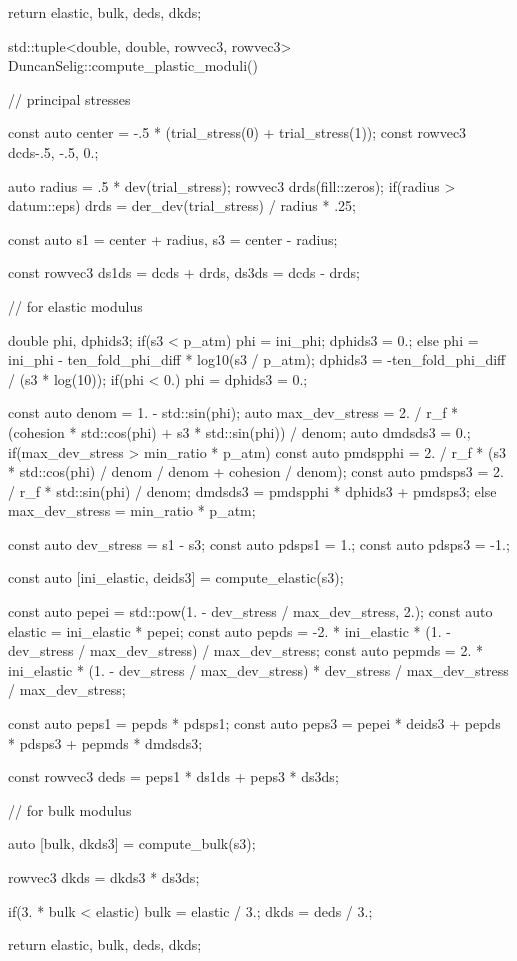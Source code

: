 \begin{cppcode}
{    return {elastic, bulk, deds, dkds};
}

std::tuple<double, double, rowvec3, rowvec3> DuncanSelig::compute_plastic_moduli() {
    // principal stresses

    const auto center = -.5 * (trial_stress(0) + trial_stress(1));
    const rowvec3 dcds{-.5, -.5, 0.};

    auto radius = .5 * dev(trial_stress);
    rowvec3 drds(fill::zeros);
    if(radius > datum::eps) drds = der_dev(trial_stress) / radius * .25;

    const auto s1 = center + radius, s3 = center - radius;

    const rowvec3 ds1ds = dcds + drds, ds3ds = dcds - drds;

    // for elastic modulus

    double phi, dphids3;
    if(s3 < p_atm) {
        phi = ini_phi;
        dphids3 = 0.;
    }
    else {
        phi = ini_phi - ten_fold_phi_diff * log10(s3 / p_atm);
        dphids3 = -ten_fold_phi_diff / (s3 * log(10));
        if(phi < 0.) phi = dphids3 = 0.;
    }

    const auto denom = 1. - std::sin(phi);
    auto max_dev_stress = 2. / r_f * (cohesion * std::cos(phi) + s3 * std::sin(phi)) / denom;
    auto dmdsds3 = 0.;
    if(max_dev_stress > min_ratio * p_atm) {
        const auto pmdspphi = 2. / r_f * (s3 * std::cos(phi) / denom / denom + cohesion / denom);
        const auto pmdsps3 = 2. / r_f * std::sin(phi) / denom;
        dmdsds3 = pmdspphi * dphids3 + pmdsps3;
    }
    else max_dev_stress = min_ratio * p_atm;

    const auto dev_stress = s1 - s3;
    const auto pdsps1 = 1.;
    const auto pdsps3 = -1.;

    const auto [ini_elastic, deids3] = compute_elastic(s3);

    const auto pepei = std::pow(1. - dev_stress / max_dev_stress, 2.);
    const auto elastic = ini_elastic * pepei;
    const auto pepds = -2. * ini_elastic * (1. - dev_stress / max_dev_stress) / max_dev_stress;
    const auto pepmds = 2. * ini_elastic * (1. - dev_stress / max_dev_stress) * dev_stress / max_dev_stress / max_dev_stress;

    const auto peps1 = pepds * pdsps1;
    const auto peps3 = pepei * deids3 + pepds * pdsps3 + pepmds * dmdsds3;

    const rowvec3 deds = peps1 * ds1ds + peps3 * ds3ds;

    // for bulk modulus

    auto [bulk, dkds3] = compute_bulk(s3);

    rowvec3 dkds = dkds3 * ds3ds;

    if(3. * bulk < elastic) {
        bulk = elastic / 3.;
        dkds = deds / 3.;
    }

    return {elastic, bulk, deds, dkds};
}
\end{cppcode}